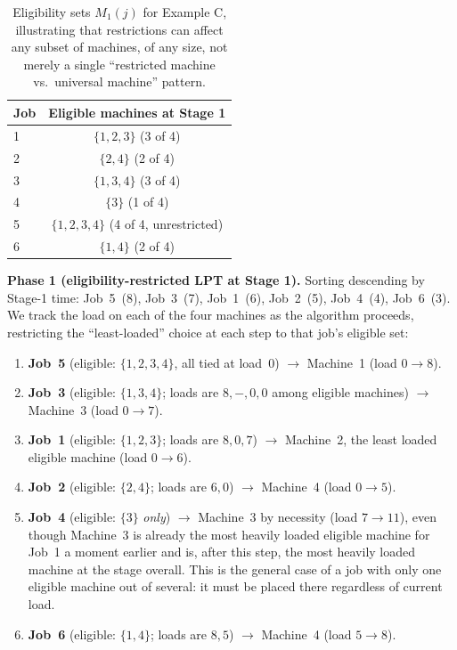\documentclass[11pt,a4paper]{article}
\begin{document}
\begin{table}[h!]
\centering
\begin{tabular}{@{}lc@{}}
\toprule
Job & Eligible machines at Stage 1 \\
\midrule
1 & $\{1,2,3\}$ \quad (3 of 4) \\
2 & $\{2,4\}$ \quad (2 of 4) \\
3 & $\{1,3,4\}$ \quad (3 of 4) \\
4 & $\{3\}$ \quad (1 of 4) \\
5 & $\{1,2,3,4\}$ \quad (4 of 4, unrestricted) \\
6 & $\{1,4\}$ \quad (2 of 4) \\
\bottomrule
\end{tabular}
\caption{Eligibility sets $M_1(j)$ for Example C, illustrating that
  restrictions can affect any subset of machines, of any size, not
  merely a single ``restricted machine vs.\ universal machine'' pattern.}
\label{tab:examplec-eligibility}
\end{table}

\textbf{Phase 1 (eligibility-restricted LPT at Stage 1).} Sorting
descending by Stage-1 time: Job~5~(8), Job~3~(7), Job~1~(6), Job~2~(5),
Job~4~(4), Job~6~(3). We track the load on each of the four machines as
the algorithm proceeds, restricting the ``least-loaded'' choice at each
step to that job's eligible set:

\begin{enumerate}
  \item \textbf{Job~5} (eligible: $\{1,2,3,4\}$, all tied at load~0)
    $\to$ Machine~1 (load $0\to8$).
  \item \textbf{Job~3} (eligible: $\{1,3,4\}$; loads are $8,-,0,0$
    among eligible machines) $\to$ Machine~3 (load $0\to7$).
  \item \textbf{Job~1} (eligible: $\{1,2,3\}$; loads are $8,0,7$) $\to$
    Machine~2, the least loaded eligible machine (load $0\to6$).
  \item \textbf{Job~2} (eligible: $\{2,4\}$; loads are $6,0$) $\to$
    Machine~4 (load $0\to5$).
  \item \textbf{Job~4} (eligible: $\{3\}$ \emph{only}) $\to$ Machine~3
    by necessity (load $7\to11$), even though Machine~3 is already the
    most heavily loaded eligible machine for Job~1 a moment earlier and
    is, after this step, the most heavily loaded machine at the stage
    overall. This is the general case of a job with only one eligible
    machine out of several: it must be placed there regardless of
    current load.
  \item \textbf{Job~6} (eligible: $\{1,4\}$; loads are $8,5$) $\to$
    Machine~4 (load $5\to8$).
\end{enumerate}
\end{document}
